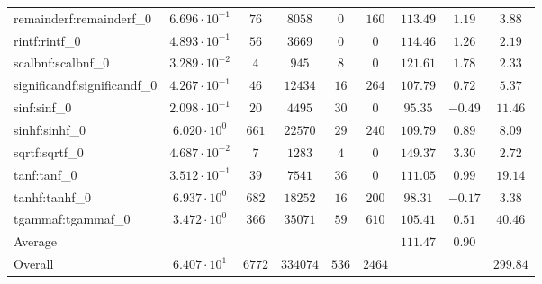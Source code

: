 \begin{tabular}{|l|c|c|c|c|c|c|c|c|}
remainderf:remainderf\_0     & $ 6.696 \cdot 10^{-1} $ & $ 76     $ & $ 8058   $ & $ 0   $ & $ 160  $ & $ 113.49      $ & $ 1.19    $ & $ 3.88    $ \\
rintf:rintf\_0               & $ 4.893 \cdot 10^{-1} $ & $ 56     $ & $ 3669   $ & $ 0   $ & $ 0    $ & $ 114.46      $ & $ 1.26    $ & $ 2.19    $ \\
scalbnf:scalbnf\_0           & $ 3.289 \cdot 10^{-2} $ & $ 4      $ & $ 945    $ & $ 8   $ & $ 0    $ & $ 121.61      $ & $ 1.78    $ & $ 2.33    $ \\
significandf:significandf\_0 & $ 4.267 \cdot 10^{-1} $ & $ 46     $ & $ 12434  $ & $ 16  $ & $ 264  $ & $ 107.79      $ & $ 0.72    $ & $ 5.37    $ \\
sinf:sinf\_0                 & $ 2.098 \cdot 10^{-1} $ & $ 20     $ & $ 4495   $ & $ 30  $ & $ 0    $ & $ 95.35       $ & $ -0.49   $ & $ 11.46   $ \\
sinhf:sinhf\_0               & $ 6.020 \cdot 10^{0}  $ & $ 661    $ & $ 22570  $ & $ 29  $ & $ 240  $ & $ 109.79      $ & $ 0.89    $ & $ 8.09    $ \\
sqrtf:sqrtf\_0               & $ 4.687 \cdot 10^{-2} $ & $ 7      $ & $ 1283   $ & $ 4   $ & $ 0    $ & $ 149.37      $ & $ 3.30    $ & $ 2.72    $ \\
tanf:tanf\_0                 & $ 3.512 \cdot 10^{-1} $ & $ 39     $ & $ 7541   $ & $ 36  $ & $ 0    $ & $ 111.05      $ & $ 0.99    $ & $ 19.14   $ \\
tanhf:tanhf\_0               & $ 6.937 \cdot 10^{0}  $ & $ 682    $ & $ 18252  $ & $ 16  $ & $ 200  $ & $ 98.31       $ & $ -0.17   $ & $ 3.38    $ \\
tgammaf:tgammaf\_0           & $ 3.472 \cdot 10^{0}  $ & $ 366    $ & $ 35071  $ & $ 59  $ & $ 610  $ & $ 105.41      $ & $ 0.51    $ & $ 40.46   $ \\
\hline
Average                      & $                     $ & $        $ & $        $ & $     $ & $      $ & $ 111.47      $ & $ 0.90    $ & $         $ \\
\hline
Overall                      & $ 6.407 \cdot 10^{1}  $ & $ 6772   $ & $ 334074 $ & $ 536 $ & $ 2464 $ & $             $ & $         $ & $ 299.84  $ \\
\hline
\end{tabular}
